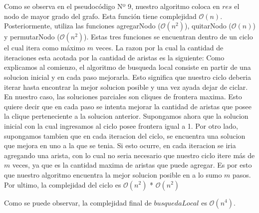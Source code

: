 \begin{itemize}
Como se observa en el pseudocódigo Nº 9, nuestro algoritmo coloca en $res$ el nodo de mayor grado del grafo. Esta función tiene complejidad $\mathcal{O}(n)$.
Posteriormente, utiliza las funciones agregarNodo ($\mathcal{O}(n^{2})$), quitarNodo ($\mathcal{O}(n)$) y permutarNodo ($\mathcal{O}(n^{2})$). Estas tres funciones se encuentran dentro de un ciclo el cual itera como máximo $m$ veces. La razon por la cual la cantidad de iteraciones esta acotada por la cantidad de aristas es la siguiente:\newline
Como explicamos al comienzo, el algoritmo de busqueda local consiste en partir de una solucion inicial y en cada paso mejorarla. Esto significa que nuestro ciclo deberia iterar hasta encontrar la mejor solucion posible y una vez ayada dejar de ciclar. En nuestro caso, las soluciones parciales son cliques de frontera maxima. Esto quiere decir que en cada paso se intenta mejorar la cantidad de aristas que posee la clique perteneciente a la solucion anterior. Supongamos ahora que la solucion inicial con la cual ingresamos al ciclo posee frontera igual a 1. Por otro lado, supongamos tambien que en cada iteracion del ciclo, se encuentra una solucion que mejora en uno a la que se tenia. Si  esto ocurre, en cada iteracion se iria agregando una arista, con lo cual no seria necesario que nuestro ciclo itere más de $m$ veces, ya que es la cantidad maxima de aristas que puede agregar. Es por esto que nuestro algoritmo encuentra la mejor solucion posible en a lo sumo $m$ pasos. Por ultimo, la complejidad del ciclo es $\mathcal{O}(n^{2})$ * $\mathcal{O}(n^{2})$                                                                        
                                                                                
\newline
Como se puede observar, la complejidad final de $busquedaLocal$ es $\mathcal{O}(n^{4})$.
\end{itemize}
